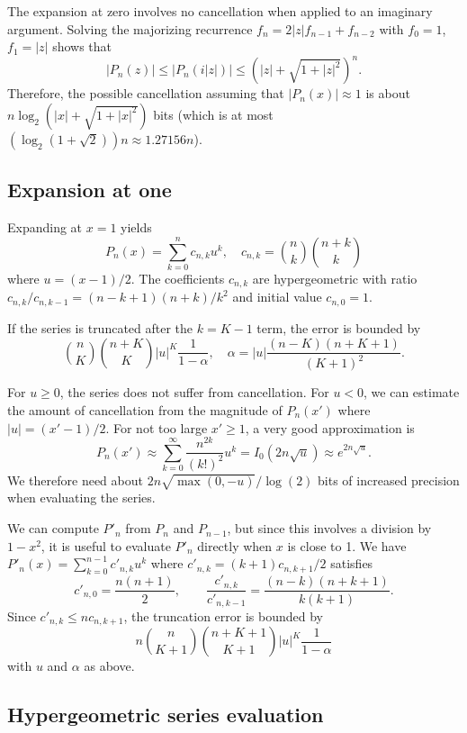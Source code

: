 \documentclass{siamart0216}
\begin{document}
The expansion at zero involves no cancellation
when applied to an imaginary argument.
Solving the majorizing recurrence $f_n = 2 |z| f_{n-1} + f_{n-2}$ with
$f_0 = 1$, $f_1 = |z|$ shows that
\[ |P_n(z)| \le |P_n(i|z|)| \le \left(|z| + \sqrt{1 + |z|^2}\right)^n. \]
Therefore, the possible cancellation assuming that $|P_n(x)| \approx 1$
is about $n \log_2(|x| + \sqrt{1 + |x|^2})$ bits
(which is at most $(\log_2 (1+\sqrt{2})) n \approx 1.27156n$).

\subsection{Expansion at one}

Expanding at $x = 1$ yields
$$P_n(x) = \sum_{k=0}^n c_{n,k} u^k, \quad c_{n,k} = {n \choose k} {n+k \choose k}$$
where $u = (x-1)/2$.
The coefficients $c_{n,k}$ are hypergeometric with
ratio $c_{n,k}/c_{n,k-1} = (n-k+1)(n+k)/k^2$
and initial value $c_{n,0} = 1$.

If the series is truncated after the $k = K - 1$ term,
the error is bounded by
\begin{equation}
\label{eq:truncerr2}
{n \choose K}{n+K \choose K} |u|^K \frac{1}{1-\alpha}, \quad \alpha = |u| \frac{(n-K)(n+K+1)}{(K+1)^2}.
\end{equation}

For $u \ge 0$, the series does not suffer from cancellation.
For $u < 0$, we can estimate the amount of
cancellation from the magnitude of $P_n(x')$ where $|u| = (x'-1)/2$.
For not too large $x' \ge 1$, a very good approximation is
$$P_n(x') \approx \sum_{k=0}^{\infty} \frac{n^{2k}}{(k!)^2} u^k = I_0(2n\sqrt{u}) \approx e^{2n\sqrt{u}}.$$
We therefore need about $2n\sqrt{\max(0,-u)} / \log(2)$ bits
of increased precision when evaluating the series.

We can compute $P'_n$ from $P_n$ and $P_{n-1}$, but since this
involves a division by $1-x^2$, it is useful to
evaluate $P'_n$ directly when $x$ is close to 1.
We have
$P'_n(x) = \sum_{k=0}^{n-1} c'_{n,k} u^k$
where $c'_{n,k} = (k+1) c_{n,k+1} / 2$ satisfies
\[
  c'_{n,0} = \frac{n(n+1)}{2}, \qquad
  \frac{c'_{n,k}}{c'_{n,k-1}} = \frac{(n-k)(n+k+1)}{k(k+1)}.
\]
Since $c'_{n,k} \le n c_{n,k+1}$, the truncation error is bounded by
\begin{equation}
\label{eq:truncerr2b}
n {n \choose K+1}{n+K+1 \choose K+1} |u|^K \frac{1}{1-\alpha}
\end{equation}
with $u$ and $\alpha$ as above.

\subsection{Hypergeometric series evaluation}
\end{document}
